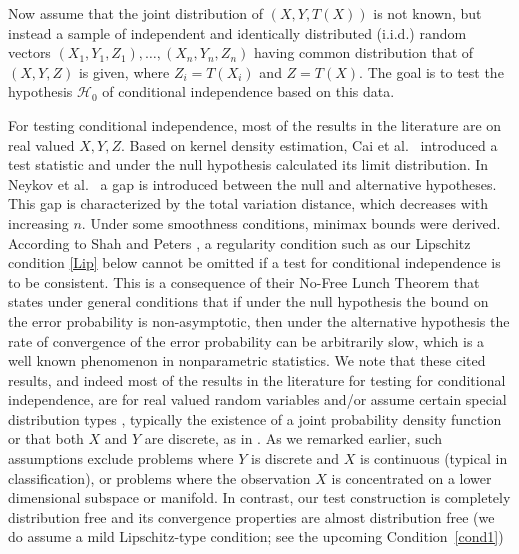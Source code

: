 \documentclass[11pt]{article}
\begin{document}
Now assume that the joint distribution of $(X,Y,T(X))$ is not known, but instead a 
 sample of independent and identically distributed (i.i.d$.$) random vectors
$(X_1,Y_1,Z_{1}),\dots ,(X_n,Y_n,Z_{n})$ having  common distribution that of  $(X,Y,Z)$ is given, where $Z_i=T(X_i)$ and $Z=T(X)$. The goal is to test the hypothesis $\mathcal{H}_0$ of conditional independence based on this data. 



For testing conditional independence, most of the results in the literature are on real valued $X,Y,Z$.
Based on kernel density estimation, Cai et al.\ \cite{CaLiZh22} introduced a test statistic and 
under the null hypothesis  calculated its limit distribution.
In Neykov et al.\ \cite{NeBaWa21} a gap is introduced between the null and alternative hypotheses. This gap is characterized by the total variation distance, which decreases with increasing $n$. Under some smoothness conditions, minimax bounds were derived.
According to Shah and  Peters \cite{ShPe20}, a regularity condition such as our  Lipschitz condition \eqref{Lip} below cannot be omitted  if a test for conditional independence is to be consistent.
This is a consequence of their No-Free Lunch Theorem that states
under general conditions that if under the null hypothesis the bound
on the error probability is non-asymptotic, then under the alternative
hypothesis the rate of convergence of the error probability can be
arbitrarily slow, which is a well known phenomenon in nonparametric
statistics. We note that these cited results,  and indeed most of the results in the literature for testing for conditional independence,  are for real valued random variables and/or assume certain special distribution types , typically  the existence of a joint probability density function or that both $X$ and $Y$ are discrete, as in \cite{NeBaWa21}. As we remarked earlier, such  assumptions exclude problems where  $Y$ is discrete and $X$ is continuous (typical in classification), or problems  where the observation $X$ is concentrated on a lower dimensional subspace or manifold. In contrast, our test construction is completely distribution free and its convergence properties are almost distribution free (we do  assume a mild Lipschitz-type condition; see the upcoming  Condition~\ref{cond1})
\end{document}
